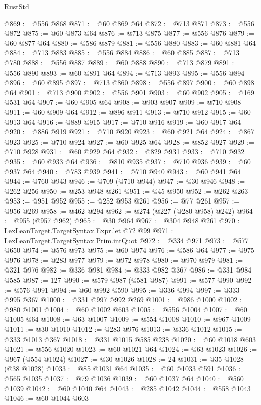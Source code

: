 \begin{lexlean}{RustStd}
\begin{coremodule}
{\begin{coremodule}
{{{{{{{{{{{{{{{{{{{{{{{{{{{{{@869 := @556 @868
@871 := @60 @869 @64
@872 := @713 @871
@873 := @556 @872
@875 := @60 @873 @64
@876 := @713 @875
@877 := @556 @876
@879 := @60 @877 @64
@880 := @586 @879
@881 := @556 @880
@883 := @60 @881 @64
@884 := @713 @883
@885 := @556 @884
@886 := @60 @885
@887 := @713 @780
@888 := @556 @887
@889 := @60 @888
@890 := @713 @879
@891 := @556 @890
@893 := @60 @891 @64
@894 := @713 @893
@895 := @556 @894
@896 := @60 @895
@897 := @713 @860
@898 := @556 @897
@900 := @60 @898 @64
@901 := @713 @900
@902 := @556 @901
@903 := @60 @902
@905 := @169 @531 @64
@907 := @60 @905 @64
@908 := @903 @907
@909 := @710 @908
@911 := @60 @909 @64
@912 := @896 @911
@913 := @710 @912
@915 := @60 @913 @64
@916 := @889 @915
@917 := @710 @916
@919 := @60 @917 @64
@920 := @886 @919
@921 := @710 @920
@923 := @60 @921 @64
@924 := @867 @923
@925 := @710 @924
@927 := @60 @925 @64
@928 := @852 @927
@929 := @710 @928
@931 := @60 @929 @64
@932 := @829 @931
@933 := @710 @932
@935 := @60 @933 @64
@936 := @810 @935
@937 := @710 @936
@939 := @60 @937 @64
@940 := @783 @939
@941 := @710 @940
@943 := @60 @941 @64
@944 := @760 @943
@946 := @709 (@710 @944)
@947 := @30 @946
@948 := @262 @256
@950 := @253 @948 @261
@951 := @45 @950
@952 := @262 @263
@953 := @951 @952
@955 := @252 @953 @261
@956 := @77 @261
@957 := @956 @269
@958 := @462 @294
@962 := @274 (@227 (@280 @958) @242)
@964 := @955 (@957 @962)
@965 := @30 @964
@967 := @304 @948 @261
@970 := LexLeanTarget.TargetSyntax.Expr.let @72 @99
@971 := LexLeanTarget.TargetSyntax.Prim.intQuot
@972 := @334 @971
@973 := @577 @650
@974 := @576 @973
@975 := @60 @974
@976 := @586 @64
@977 := @975 @976
@978 := @283 @977
@979 := @972 @978
@980 := @970 @979
@981 := @321 @976
@982 := @336 @981
@984 := @333 @982 @367
@986 := @331 @984 @585
@987 := 127
@990 := @579 @987 (@581 @987)
@991 := @577 @990
@992 := @576 @991
@994 := @60 @992 @590
@995 := @336 @994
@997 := @333 @995 @367
@1000 := @331 @997 @992 @269
@1001 := @986 @1000
@1002 := @980 @1001
@1004 := @60 @1002 @603
@1005 := @556 @1004
@1007 := @60 @1005 @64
@1008 := @63 @1007
@1009 := @554 @1008
@1010 := @967 @1009
@1011 := @30 @1010
@1012 := @283 @976
@1013 := @336 @1012
@1015 := @333 @1013 @367
@1018 := @331 @1015 @585 @238
@1020 := @60 @1018 @603
@1021 := @556 @1020
@1023 := @60 @1021 @64
@1024 := @63 @1023
@1026 := @967 (@554 @1024)
@1027 := @30 @1026
@1028 := 24
@1031 := @35 @1028 (@38 @1028)
@1033 := @85 @1031 @64
@1035 := @60 @1033 @591
@1036 := @565 @1035
@1037 := @79 @1036
@1039 := @60 @1037 @64
@1040 := @560 @1039
@1042 := @60 @1040 @64
@1043 := @285 @1042
@1044 := @558 @1043
@1046 := @60 @1044 @603
}}}}}}}}}}}}}}}}}}}}}}}}}}}}}
\end{coremodule}}
\end{coremodule}
\end{lexlean}
